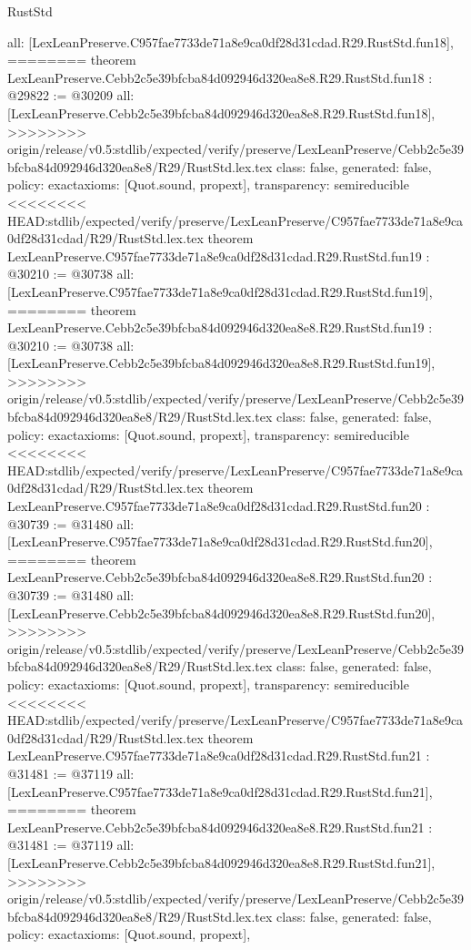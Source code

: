 \begin{lexlean}{RustStd}
\begin{coremodule}
{\begin{coremodule}
{{{{{{{{{{{{{{{{{{{{{  all: [LexLeanPreserve.C957fae7733de71a8e9ca0df28d31cdad.R29.RustStd.fun18],
========
theorem LexLeanPreserve.Cebb2c5e39bfcba84d092946d320ea8e8.R29.RustStd.fun18 : @29822 := @30209 {
  all: [LexLeanPreserve.Cebb2c5e39bfcba84d092946d320ea8e8.R29.RustStd.fun18],
>>>>>>>> origin/release/v0.5:stdlib/expected/verify/preserve/LexLeanPreserve/Cebb2c5e39bfcba84d092946d320ea8e8/R29/RustStd.lex.tex
  class: false,
  generated: false,
  policy: exact{axioms: [Quot.sound, propext]},
  transparency: semireducible
}
<<<<<<<< HEAD:stdlib/expected/verify/preserve/LexLeanPreserve/C957fae7733de71a8e9ca0df28d31cdad/R29/RustStd.lex.tex
theorem LexLeanPreserve.C957fae7733de71a8e9ca0df28d31cdad.R29.RustStd.fun19 : @30210 := @30738 {
  all: [LexLeanPreserve.C957fae7733de71a8e9ca0df28d31cdad.R29.RustStd.fun19],
========
theorem LexLeanPreserve.Cebb2c5e39bfcba84d092946d320ea8e8.R29.RustStd.fun19 : @30210 := @30738 {
  all: [LexLeanPreserve.Cebb2c5e39bfcba84d092946d320ea8e8.R29.RustStd.fun19],
>>>>>>>> origin/release/v0.5:stdlib/expected/verify/preserve/LexLeanPreserve/Cebb2c5e39bfcba84d092946d320ea8e8/R29/RustStd.lex.tex
  class: false,
  generated: false,
  policy: exact{axioms: [Quot.sound, propext]},
  transparency: semireducible
}
<<<<<<<< HEAD:stdlib/expected/verify/preserve/LexLeanPreserve/C957fae7733de71a8e9ca0df28d31cdad/R29/RustStd.lex.tex
theorem LexLeanPreserve.C957fae7733de71a8e9ca0df28d31cdad.R29.RustStd.fun20 : @30739 := @31480 {
  all: [LexLeanPreserve.C957fae7733de71a8e9ca0df28d31cdad.R29.RustStd.fun20],
========
theorem LexLeanPreserve.Cebb2c5e39bfcba84d092946d320ea8e8.R29.RustStd.fun20 : @30739 := @31480 {
  all: [LexLeanPreserve.Cebb2c5e39bfcba84d092946d320ea8e8.R29.RustStd.fun20],
>>>>>>>> origin/release/v0.5:stdlib/expected/verify/preserve/LexLeanPreserve/Cebb2c5e39bfcba84d092946d320ea8e8/R29/RustStd.lex.tex
  class: false,
  generated: false,
  policy: exact{axioms: [Quot.sound, propext]},
  transparency: semireducible
}
<<<<<<<< HEAD:stdlib/expected/verify/preserve/LexLeanPreserve/C957fae7733de71a8e9ca0df28d31cdad/R29/RustStd.lex.tex
theorem LexLeanPreserve.C957fae7733de71a8e9ca0df28d31cdad.R29.RustStd.fun21 : @31481 := @37119 {
  all: [LexLeanPreserve.C957fae7733de71a8e9ca0df28d31cdad.R29.RustStd.fun21],
========
theorem LexLeanPreserve.Cebb2c5e39bfcba84d092946d320ea8e8.R29.RustStd.fun21 : @31481 := @37119 {
  all: [LexLeanPreserve.Cebb2c5e39bfcba84d092946d320ea8e8.R29.RustStd.fun21],
>>>>>>>> origin/release/v0.5:stdlib/expected/verify/preserve/LexLeanPreserve/Cebb2c5e39bfcba84d092946d320ea8e8/R29/RustStd.lex.tex
  class: false,
  generated: false,
  policy: exact{axioms: [Quot.sound, propext]},
}}}}}}}}}}}}}}}}}}}}}}}}}
\end{coremodule}}
\end{coremodule}
\end{lexlean}

